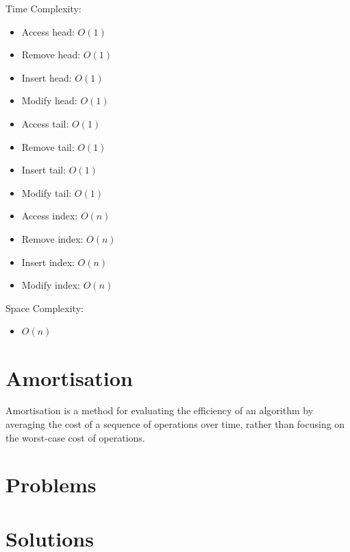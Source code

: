 Time Complexity:
\begin{itemize}
    \item Access head: $O(1)$
    \item Remove head: $O(1)$
    \item Insert head: $O(1)$
    \item Modify head: $O(1)$
    \item Access tail: $O(1)$
    \item Remove tail: $O(1)$
    \item Insert tail: $O(1)$
    \item Modify tail: $O(1)$
    \item Access index: $O(n)$
    \item Remove index: $O(n)$
    \item Insert index: $O(n)$
    \item Modify index: $O(n)$
\end{itemize}

Space Complexity:
\begin{itemize}
    \item $O(n)$
\end{itemize}

\section{Amortisation}

Amortisation is a method for evaluating the efficiency of an algorithm by averaging the cost of a sequence of operations over time, rather than focusing on the worst-case cost of operations.

\newpage

\section{Problems}

\section{Solutions}
